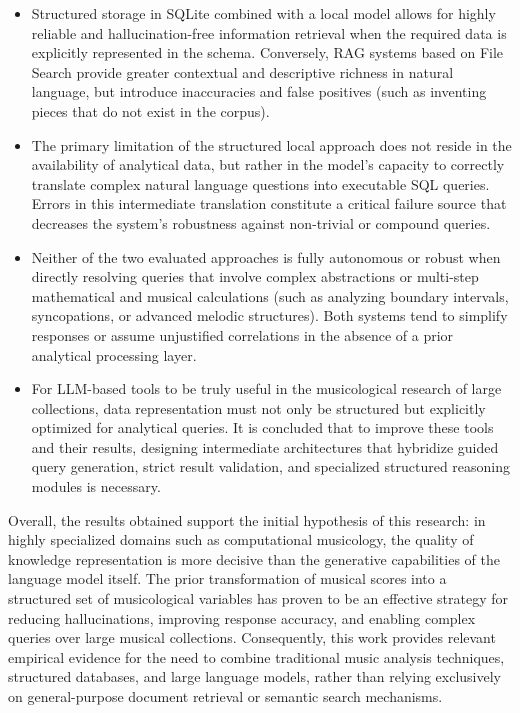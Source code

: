 \begin{itemize}
    \item Structured storage in SQLite combined with a local model allows for highly reliable and hallucination-free information retrieval when the required data is explicitly represented in the schema. Conversely, RAG systems based on File Search provide greater contextual and descriptive richness in natural language, but introduce inaccuracies and false positives (such as inventing pieces that do not exist in the corpus).
    \item The primary limitation of the structured local approach does not reside in the availability of analytical data, but rather in the model's capacity to correctly translate complex natural language questions into executable SQL queries. Errors in this intermediate translation constitute a critical failure source that decreases the system's robustness against non-trivial or compound queries.
    \item Neither of the two evaluated approaches is fully autonomous or robust when directly resolving queries that involve complex abstractions or multi-step mathematical and musical calculations (such as analyzing boundary intervals, syncopations, or advanced melodic structures). Both systems tend to simplify responses or assume unjustified correlations in the absence of a prior analytical processing layer.
    \item For LLM-based tools to be truly useful in the musicological research of large collections, data representation must not only be structured but explicitly optimized for analytical queries. It is concluded that to improve these tools and their results, designing intermediate architectures that hybridize guided query generation, strict result validation, and specialized structured reasoning modules is necessary.
\end{itemize}

Overall, the results obtained support the initial hypothesis of this research: in highly specialized domains such as computational musicology, the quality of knowledge representation is more decisive than the generative capabilities of the language model itself. The prior transformation of musical scores into a structured set of musicological variables has proven to be an effective strategy for reducing hallucinations, improving response accuracy, and enabling complex queries over large musical collections. Consequently, this work provides relevant empirical evidence for the need to combine traditional music analysis techniques, structured databases, and large language models, rather than relying exclusively on general-purpose document retrieval or semantic search mechanisms.

